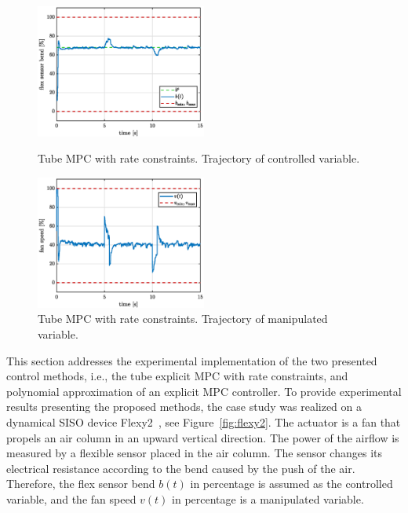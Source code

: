 \documentclass[letterpaper, 10 pt, conference]{ieeeconf}
\begin{document}
\begin{figure}[hbp!]
	\begin{center}
		\includegraphics[width=0.5\textwidth]{images/deltaU_b_new.eps}
		\caption{Tube MPC with rate constraints. Trajectory of controlled variable.}
		\label{fig:deltaU_y}
	\end{center}
	\begin{center}
		\includegraphics[width=0.5\textwidth]{images/deltaU_v_new.eps}
		\caption{Tube MPC with rate constraints. Trajectory of manipulated variable.}
		\label{fig:deltaU_u}
	\end{center}
\end{figure}

This section addresses the experimental implementation of the two presented control methods, i.e., the tube explicit MPC with rate constraints, and polynomial approximation of an explicit MPC controller. To provide experimental results presenting the proposed methods, the case study was realized on a dynamical SISO device Flexy2~\cite{flexy2}, see Figure~\ref{fig:flexy2}. The actuator is a fan that propels an air column in an upward vertical direction. The power of the airflow is measured
by a flexible sensor placed in the air column. The sensor changes its electrical resistance according to the bend caused by the push of the air. Therefore, the flex sensor bend $b(t)$ in percentage is assumed as the controlled variable, and the fan speed $v(t)$ in percentage is a manipulated variable.
\end{document}
